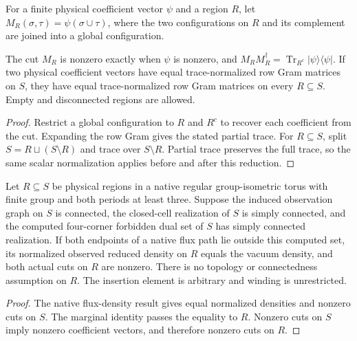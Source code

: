 \begin{definition}
    \label{def:peps_region_physical_cut}
    \leanok
    For a finite physical coefficient vector $\psi$ and a region $R$, let
    $M_R(\sigma,\tau)=\psi(\sigma\cup\tau)$, where the two configurations
    on $R$ and its complement are joined into a global configuration.
\end{definition}

\begin{lemma}
    \label{lem:peps_cut_density_subregion}
    \leanok
    The cut $M_R$ is nonzero exactly when $\psi$ is nonzero, and
    $M_RM_R^\dagger=\operatorname{Tr}_{R^c}|\psi\rangle\langle\psi|$.
    If two physical coefficient vectors have equal trace-normalized row
    Gram matrices on $S$, they have equal trace-normalized row Gram matrices
    on every $R\subseteq S$. Empty and disconnected regions are allowed.
\end{lemma}
\begin{proof}\leanok
    Restrict a global configuration to $R$ and $R^c$ to recover each
    coefficient from the cut. Expanding the row Gram gives the stated
    partial trace. For $R\subseteq S$, split $S=R\sqcup(S\setminus R)$
    and trace over $S\setminus R$. Partial trace preserves the full trace,
    so the same scalar normalization applies before and after this reduction.
\end{proof}

\begin{lemma}
    \label{lem:peps_flux_envelope_density}
    \leanok
    Let $R\subseteq S$ be physical regions in a native regular group-isometric
    torus with finite group and both periods at least three. Suppose the
    induced observation graph on $S$ is connected, the closed-cell realization
    of $S$ is simply connected, and the computed four-corner forbidden dual set
    of $S$ has simply connected realization. If both endpoints of a native
    flux path lie outside this computed set, its normalized observed reduced
    density on $R$ equals the vacuum density, and both actual cuts on $R$
    are nonzero. There is no topology or connectedness assumption on $R$.
    The insertion element is arbitrary and winding is unrestricted.
\end{lemma}
\begin{proof}\leanok
    The native flux-density result gives equal normalized densities and
    nonzero cuts on $S$. The marginal identity passes the equality to $R$.
    Nonzero cuts on $S$ imply nonzero coefficient vectors, and therefore
    nonzero cuts on $R$.
\end{proof}
